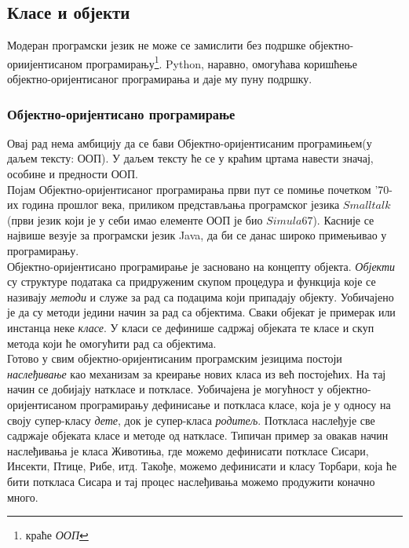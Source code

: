 \subsection{Класе и објекти}
		Модеран програмски језик не може се замислити без подршке објектно-ориијентисаном програмирању\footnote{краће \emph{ООП}}. Python, наравно, омогућава коришћење објектно-оријентисаног програмирања и даје му пуну подршку.  
		\subsubsection{Објектно-оријентисано програмирање}
		Овај рад нема амбицију да се бави Објектно-оријентисаним програмињем(у даљем тексту: ООП). У даљем тексту ће се у краћим цртама навести значај, особине и предности ООП. \\
	Појам Објектно-оријентисаног програмирања први пут се помиње почетком '70-их година прошлог века, приликом представљања програмског језика $Smalltalk$ (први језик који је у себи имао елементе ООП је био $Simula67$). Касније се највише везује за програмски језик Java, да би се данас широко примењивао у програмирању. \\
	     Објектно-оријентисано програмирање је засновано на концепту објекта. \emph{Објекти} су структуре података са придруженим скупом процедура и функција које се називају \emph{методи} и служе за рад са подацима који припадају објекту. Уобичајено је да су методи једини начин за рад са објектима. Сваки објекат је примерак или инстанца неке \emph{класе}. У класи се дефинише садржај објеката те класе и скуп метода који ће омогућити рад са објектима.\\
	     Готово у свим објектно-оријентисаним програмским језицима постоји \emph{наслеђивање} као механизам за креирање нових класа из већ постојећих. На тај начин се добијају наткласе и поткласе. 
		 Уобичајена је могућност у објектно-оријентисаном програмирању дефинисање и поткласа класе, која је у односу на своју супер-класу \emph{дете}, док је супер-класа \emph{родитељ}. Поткласа наслеђује све садржаје објеката класе и методе од наткласе. Типичан пример за овакав начин наслеђивања је класа Животиња, где можемо дефинисати поткласе Сисари, Инсекти, Птице, Рибе, итд. Такође, можемо дефинисати и класу Торбари, која ће бити поткласа Сисара и тај процес наслеђивања можемо продужити коначно много. 
